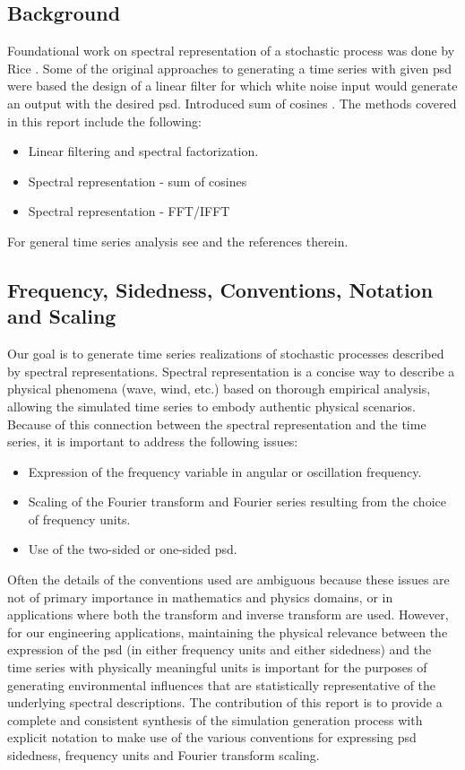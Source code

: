 \documentclass[techreport, article]{npsreport2018}
\begin{document}
\subsection{Background}
Foundational work on spectral representation of a stochastic process was done by 
 Rice \cite{rice44mathematical1,rice45mathematical2}.  Some of the original approaches to generating a time series with given \ac{psd} were based the design of a linear filter for which white noise input would generate an output with the desired \ac{psd}.  Introduced sum of cosines \cite{borgman69ocean, shinozuka72monte}.  The methods covered in this report include the following:
\begin{itemize}
\item Linear filtering and spectral factorization.
\item Spectral representation - sum of cosines
\item Spectral representation - FFT/IFFT
\end{itemize}
\noindent
For general time series analysis see \cite{marchal15notes} and the references therein.

\subsection{Frequency, Sidedness, Conventions, Notation and Scaling}

Our goal is to generate time series realizations of stochastic processes described by spectral representations.  Spectral representation is a concise way to describe a physical phenomena (wave, wind, etc.) based on thorough empirical analysis, allowing the simulated time series to embody authentic physical scenarios.  Because of this connection between the spectral representation and the time series, it is important to address the following issues:
\begin{itemize}
\item Expression of the frequency variable in angular or oscillation frequency.
\item Scaling of the Fourier transform and Fourier series resulting from the choice of frequency units.
\item Use of the two-sided or one-sided \ac{psd}.
\end{itemize}
Often the details of the conventions used are ambiguous because these issues are not of primary importance in mathematics and physics domains, or in applications where both the transform and inverse transform are used.  However, for our engineering applications, maintaining the physical relevance between the expression of the \ac{psd} (in either frequency units and either sidedness) and the time series with physically meaningful units is important for the purposes of generating environmental influences that are statistically representative of the underlying spectral descriptions.  The contribution of this report is to provide a complete and consistent synthesis of the simulation generation process with explicit notation to make use of the various conventions for expressing \ac{psd} sidedness, frequency units and Fourier transform scaling.
\end{document}
